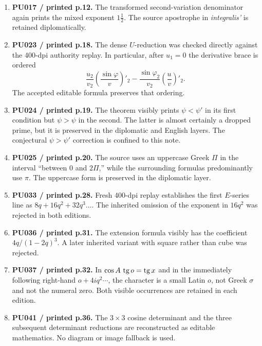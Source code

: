 \documentclass[10pt]{article}
\begin{document}
\begin{enumerate}
\item[8.] \textbf{PU017 / printed p.12.} The transformed second-variation denominator again prints the mixed exponent $1\frac12$. The source apostrophe in \emph{integralis'} is retained diplomatically.

\item[9.] \textbf{PU023 / printed p.18.} The dense $U$-reduction was checked directly against the 400-dpi authority replay. In particular, after $u_1=0$ the derivative brace is ordered
\[
 \frac{u_2}{v_2}\left(\frac{\sin\varphi}{v}\right)'_2
 -\frac{\sin\varphi_2}{v_2}\left(\frac{u}{v}\right)'_2.
\]
The accepted editable formula preserves that ordering.

\item[10.] \textbf{PU024 / printed p.19.} The theorem visibly prints $\psi<\psi'$ in its first condition but $\psi>\psi$ in the second. The latter is almost certainly a dropped prime, but it is preserved in the diplomatic and English layers. The conjectural $\psi>\psi'$ correction is confined to this note.

\item[11.] \textbf{PU025 / printed p.20.} The source uses an uppercase Greek $\Pi$ in the interval ``between $0$ and $2\Pi$,'' while the surrounding formulas predominantly use $\pi$. The uppercase form is preserved in the diplomatic layer.

\item[12.] \textbf{PU033 / printed p.28.} Fresh 400-dpi replay establishes the first $E$-series line as $8q+16q^2+32q^3\ldots$. The inherited omission of the exponent in $16q^2$ was rejected in both editions.

\item[13.] \textbf{PU036 / printed p.31.} The extension formula visibly has the coefficient $4q/(1-2q)^3$. A later inherited variant with square rather than cube was rejected.

\item[14.] \textbf{PU037 / printed p.32.} In $\cos A\,\operatorname{tg} o=\operatorname{tg} x$ and in the immediately following right-hand $o+4iq^2\cdots$, the character is a small Latin $o$, not Greek $\sigma$ and not the numeral zero. Both visible occurrences are retained in each edition.

\item[15.] \textbf{PU041 / printed p.36.} The $3\times3$ cosine determinant and the three subsequent determinant reductions are reconstructed as editable mathematics. No diagram or image fallback is used.


\end{enumerate}
\end{document}
